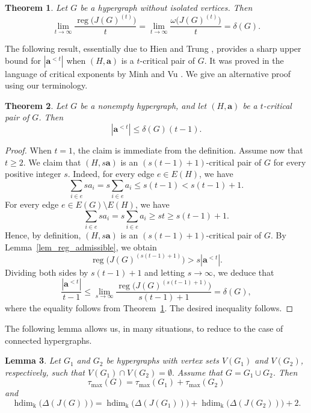 \documentclass[12pt,amscd]{amsart}
\newtheorem{thm}{Theorem}[section]
\newtheorem{lem}[thm]{Lemma}
\theoremstyle{definition}
\DeclareMathOperator{\hdim}{hdim}
\DeclareMathOperator{\reg}{reg}
\def\a {\mathbf a}
\def\k {\mathrm k}
\begin{document}
\begin{thm}\label{thm_limit_reg}
Let $G$ be a hypergraph without isolated vertices. Then
\[
\lim_{t \to \infty} \frac{\reg\bigl(J(G)^{(t)}\bigr)}{t}
=
\lim_{t \to \infty} \frac{\omega\bigl(J(G)^{(t)}\bigr)}{t}
=
\delta(G).
\]
\end{thm}

The following result, essentially due to Hien and Trung \cite[Theorem 2.2]{HiT}, provides a sharp upper bound for $|\a^{<t}|$ when $(H,\a)$ is a $t$-critical pair of $G$. It was proved in the language of critical exponents by Minh and Vu \cite[Theorem 2.18]{MV3}. We give an alternative proof using our terminology.

\begin{thm}\label{thm_degree_bound}
Let $G$ be a nonempty hypergraph, and let $(H,\a)$ be a $t$-critical pair of $G$. Then
\[
|\a^{<t}| \le \delta(G)(t-1).
\]
\end{thm}

\begin{proof}
When $t = 1$, the claim is immediate from the definition. Assume now that $t \ge 2$. We claim that $(H, s\a)$ is an $(s(t-1)+1)$-critical pair of $G$ for every positive integer $s$. Indeed, for every edge $e \in E(H)$, we have
\[
\sum_{i \in e} sa_i
=
s\sum_{i \in e} a_i
\le
s(t-1)
<
s(t-1)+1.
\]
For every edge $e \in E(G) \setminus E(H)$, we have
\[
\sum_{i \in e} sa_i
=
s\sum_{i \in e} a_i
\ge
st
\ge
s(t-1)+1.
\]
Hence, by definition, $(H,s\a)$ is an $(s(t-1)+1)$-critical pair of $G$. By Lemma~\ref{lem_reg_admissible}, we obtain
\[
\reg\bigl(J(G)^{(s(t-1)+1)}\bigr)
>
s |\a^{<t}|.
\]
Dividing both sides by $s(t-1)+1$ and letting $s \to \infty$, we deduce that
\[
\frac{|\a^{<t}|}{t-1}
\le
\lim_{s \to \infty}
\frac{\reg\bigl(J(G)^{(s(t-1)+1)}\bigr)}{s(t-1)+1}
=
\delta(G),
\]
where the equality follows from Theorem~\ref{thm_limit_reg}. The desired inequality follows.
\end{proof}

The following lemma allows us, in many situations, to reduce to the case of connected hypergraphs.

\begin{lem}\label{lem_disjoint}
Let $G_1$ and $G_2$ be hypergraphs with vertex sets $V(G_1)$ and $V(G_2)$, respectively, such that
\(V(G_1) \cap V(G_2) = \emptyset.\) Assume that $G = G_1 \cup G_2$. Then
\[
\tau_{\max}(G) = \tau_{\max}(G_1) + \tau_{\max}(G_2)
\]
and
\[
\hdim_{\k}\bigl(\Delta(J(G))\bigr)
=
\hdim_{\k}\bigl(\Delta(J(G_1))\bigr)
+
\hdim_{\k}\bigl(\Delta(J(G_2))\bigr)
+
2.
\]
\end{lem}
\end{document}
